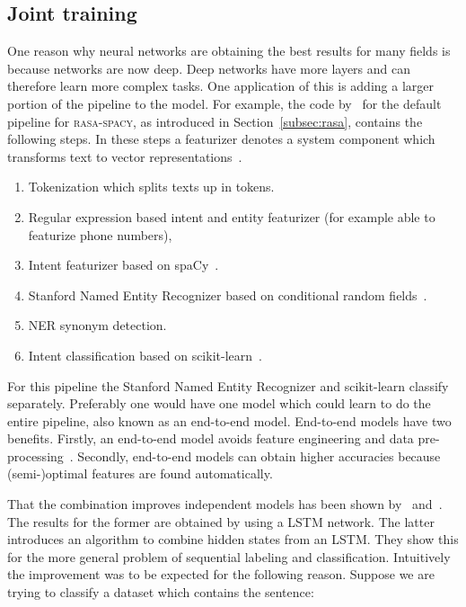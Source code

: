 \subsection{Joint training}
\label{subsec:joint_training}
One reason why neural networks are obtaining the best results for many fields is because networks are now deep.
Deep networks have more layers and can therefore learn more complex tasks.
One application of this is adding a larger portion of the pipeline to the model.
For example, the code by~\citet{rasa2018config} for the default pipeline for \textsc{rasa-spacy}, as introduced in Section~\ref{subsec:rasa}, contains the following steps.
In these steps a featurizer denotes a system component which transforms text to vector representations~\citep{brutlag2000challenges}.
\begin{enumerate}
    \item Tokenization which splits texts up in tokens.
    \item Regular expression based intent and entity featurizer (for example able to featurize phone numbers),
    \item Intent featurizer based on spaCy~\citep{spacy2019}.
    \item Stanford Named Entity Recognizer based on conditional random fields~\citep{finkel2005incorporating}.
    \item NER synonym detection.
    \item Intent classification based on scikit-learn~\citep{scikit2019}.
\end{enumerate}

For this pipeline the Stanford Named Entity Recognizer and scikit-learn classify separately.
Preferably one would have one model which could learn to do the entire pipeline, also known as an end-to-end model.
End-to-end models have two benefits.
Firstly, an end-to-end model avoids feature engineering and data pre-processing~\citep{ma2016end}.
Secondly, end-to-end models can obtain higher accuracies because (semi-)optimal features are found automatically.

That the combination improves independent models has been shown by~\citet{ma2017jointly} and~\citet{zhang2018joint}.
The results for the former are obtained by using a LSTM network.
The latter introduces an algorithm to combine hidden states from an LSTM.
They show this for the more general problem of sequential labeling and classification.
Intuitively the improvement was to be expected for the following reason.
Suppose we are trying to classify a dataset which contains the sentence:

